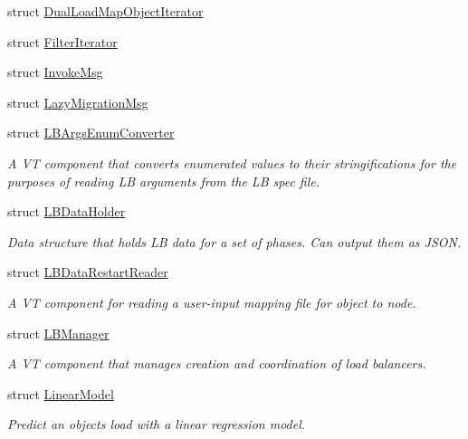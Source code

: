 \begin{DoxyCompactItemize}
\item 
struct \hyperlink{structvt_1_1vrt_1_1collection_1_1balance_1_1_dual_load_map_object_iterator}{Dual\+Load\+Map\+Object\+Iterator}
\item 
struct \hyperlink{structvt_1_1vrt_1_1collection_1_1balance_1_1_filter_iterator}{Filter\+Iterator}
\item 
struct \hyperlink{structvt_1_1vrt_1_1collection_1_1balance_1_1_invoke_msg}{Invoke\+Msg}
\item 
struct \hyperlink{structvt_1_1vrt_1_1collection_1_1balance_1_1_lazy_migration_msg}{Lazy\+Migration\+Msg}
\item 
struct \hyperlink{structvt_1_1vrt_1_1collection_1_1balance_1_1_l_b_args_enum_converter}{L\+B\+Args\+Enum\+Converter}
\begin{DoxyCompactList}\small\item\em A VT component that converts enumerated values to their stringifications for the purposes of reading LB arguments from the LB spec file. \end{DoxyCompactList}\item 
struct \hyperlink{structvt_1_1vrt_1_1collection_1_1balance_1_1_l_b_data_holder}{L\+B\+Data\+Holder}
\begin{DoxyCompactList}\small\item\em Data structure that holds LB data for a set of phases. Can output them as J\+S\+ON. \end{DoxyCompactList}\item 
struct \hyperlink{structvt_1_1vrt_1_1collection_1_1balance_1_1_l_b_data_restart_reader}{L\+B\+Data\+Restart\+Reader}
\begin{DoxyCompactList}\small\item\em A VT component for reading a user-\/input mapping file for object to node. \end{DoxyCompactList}\item 
struct \hyperlink{structvt_1_1vrt_1_1collection_1_1balance_1_1_l_b_manager}{L\+B\+Manager}
\begin{DoxyCompactList}\small\item\em A VT component that manages creation and coordination of load balancers. \end{DoxyCompactList}\item 
struct \hyperlink{structvt_1_1vrt_1_1collection_1_1balance_1_1_linear_model}{Linear\+Model}
\begin{DoxyCompactList}\small\item\em Predict an object\textquotesingle{}s load with a linear regression model. \end{DoxyCompactList}\item 

\end{DoxyCompactItemize}
